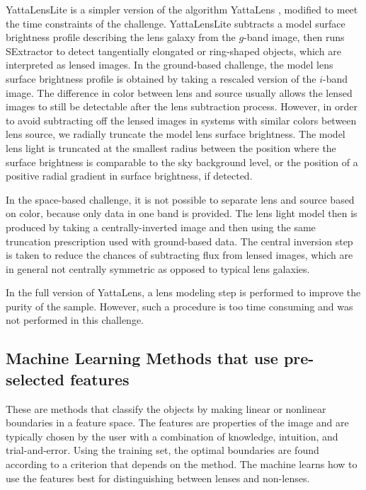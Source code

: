 \documentclass{aa}
\begin{document}
YattaLensLite is a simpler version of the algorithm YattaLens \citep{2017arXiv170401585S}, modified to meet the time constraints of the challenge.
YattaLensLite subtracts a model surface brightness profile describing the lens galaxy from the $g$-band image, then runs SExtractor to detect tangentially elongated or ring-shaped objects, which are interpreted as lensed images.
In the ground-based challenge, the model lens surface brightness profile is obtained by taking a rescaled version of the $i$-band image.
The difference in color between lens and source usually allows the lensed images to still be detectable after the lens subtraction process.
However, in order to avoid subtracting off the lensed images in systems with similar colors between lens source, we radially truncate the model lens surface brightness.
The model lens light is truncated at the smallest radius between the position where the surface brightness is comparable to the sky background level, or the position of a positive radial gradient in surface brightness, if detected.

In the space-based challenge, it is not possible to separate lens and source based on color, because only data in one band is provided. The lens light model then is produced by taking a centrally-inverted image and then using the same truncation prescription used with ground-based data. The central inversion step is taken to reduce the chances of subtracting flux from lensed images, which are in general not centrally symmetric as opposed to typical lens galaxies.

In the full version of YattaLens, a lens modeling step is performed to improve the purity of the sample. However, such a procedure is too time consuming and was not performed in this challenge.

\subsection{Machine Learning Methods that use pre-selected features}

These are methods that classify the objects by making linear or nonlinear boundaries in a feature space.  The features are properties of the image and are typically chosen by the user with a combination of knowledge, intuition, and trial-and-error.  Using the training set, the optimal boundaries are found according to a criterion that depends on the method.  The machine learns how to use the features best for distinguishing between lenses and non-lenses.
\end{document}
